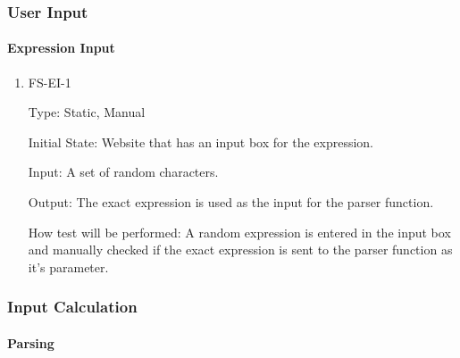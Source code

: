 \documentclass[12pt, titlepage]{article}
\begin{document}
\subsubsection{User Input}
		
\paragraph{Expression Input}

\begin{enumerate}

\item{FS-EI-1}

Type: Static, Manual
					
Initial State: Website that has an input box for the expression.
					
Input: A set of random characters.
					
Output: The exact expression is used as the input for the parser function.
					
How test will be performed: A random expression is entered in the input box and manually checked if the exact expression is sent to the parser function as it's parameter.
					

\end{enumerate}
\subsubsection{Input Calculation}
		
\paragraph{Parsing}
\end{document}

